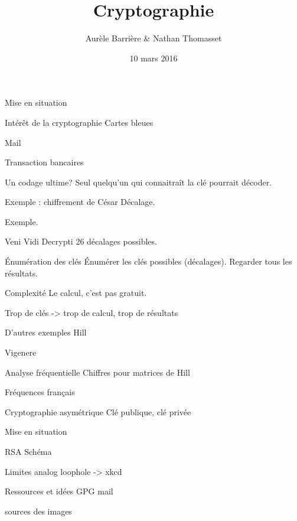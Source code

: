 \documentclass{beamer}
\author{Aurèle Barrière \& Nathan Thomasset}
\title{Cryptographie}
\date{10 mars 2016}
\begin{document}
\begin{frame}
\maketitle
\end{frame}

\begin{frame}{Mise en situation}
  \end{frame}

\begin{frame}{Intérêt de la cryptographie}
  Cartes bleues

  Mail

  Transaction bancaires
\end{frame}

\begin{frame}{Un codage ultime?}
  Seul quelqu'un qui connaitraît la clé pourrait décoder.
  \end{frame}

\begin{frame}{Exemple : chiffrement de César}
  Décalage.

  Exemple.
\end{frame}

\begin{frame}{Veni Vidi Decrypti}
  26 décalages possibles.
  \end{frame}

\begin{frame}{Énumération des clés}
  Énumérer les clés possibles (décalages). Regarder tous les résultats.
  \end{frame}

\begin{frame}{Complexité}
  Le calcul, c'est pas gratuit.

  Trop de clés -> trop de calcul, trop de résultats
  \end{frame}

\begin{frame}{D'autres exemples}
  Hill

  Vigenere
  \end{frame}

\begin{frame}{Analyse fréquentielle}
  Chiffres pour matrices de Hill

  Fréquences français
  \end{frame}


\begin{frame}{Cryptographie asymétrique}
  Clé publique, clé privée

  Mise en situation
\end{frame}

\begin{frame}{RSA}
  Schéma
  \end{frame}

\begin{frame}{Limites}
  analog loophole -> xkcd
  \end{frame}

\begin{frame}{Ressources et idées}
  GPG mail
  
  sources des images
  \end{frame}
\end{document}
